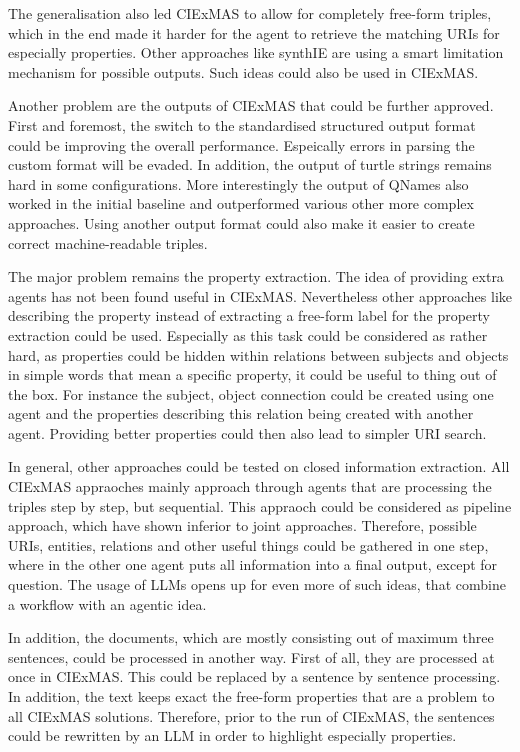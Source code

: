 \documentclass[a4paper,oneside,bibliography=totoc]{scrbook}
\begin{document}
The generalisation also led CIExMAS to allow for completely free-form triples, which in the end made it harder for the agent to retrieve the matching URIs for especially properties. Other approaches like synthIE are using a smart limitation mechanism for possible outputs. Such ideas could also be used in CIExMAS.

Another problem are the outputs of CIExMAS that could be further approved. First and foremost, the switch to the standardised structured output format could be improving the overall performance. Espeically errors in parsing the custom format will be evaded. In addition, the output of turtle strings remains hard in some configurations. More interestingly the output of QNames also worked in the initial baseline and outperformed various other more complex approaches. Using another output format could also make it easier to create correct machine-readable triples.

The major problem remains the property extraction. The idea of providing extra agents has not been found useful in CIExMAS. Nevertheless other approaches like describing the property instead of extracting a free-form label for the property extraction could be used. Especially as this task could be considered as rather hard, as properties could be hidden within relations between subjects and objects in simple words that mean a specific property, it could be useful to thing out of the box. For instance the subject, object connection could be created using one agent and the properties describing this relation being created with another agent. Providing better properties could then also lead to simpler URI search.

In general, other approaches could be tested on closed information extraction. All CIExMAS appraoches mainly approach through agents that are processing the triples step by step, but sequential. This appraoch could be considered as pipeline approach, which have shown inferior to joint approaches. Therefore, possible URIs, entities, relations and other useful things could be gathered in one step, where in the other one agent puts all information into a final output, except for question. The usage of \acp{LLM} opens up for even more of such ideas, that combine a workflow with an agentic idea.

In addition, the documents, which are mostly consisting out of maximum three sentences, could be processed in another way. First of all, they are processed at once in CIExMAS. This could be replaced by a sentence by sentence processing. In addition, the text keeps exact the free-form properties that are a problem to all CIExMAS solutions. Therefore, prior to the run of CIExMAS, the sentences could be rewritten by an \ac{LLM} in order to highlight especially properties.
\end{document}
